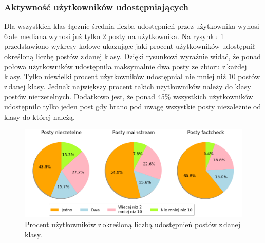\subsubsection{Aktywność użytkowników udostępniających}
Dla wszystkich klas łącznie średnia liczba udostępnień przez użytkownika wynosi 6\,ale mediana wynosi już tylko 2 posty na użytkownika. Na rysynku \ref{fig:retweets-per-user} przedstawiono wykresy kołowe ukazujące jaki procent użytkowników udostępnił określoną liczbę postów z\,danej klasy. Dzięki rysunkowi wyraźnie widać, że ponad połowa użytkowników udostępniła maksymalnie dwa posty ze zbioru z\,każdej klasy. Tylko niewielki procent użytkowników udostępniał nie mniej niż 10 postów z\,danej klasy. Jednak największy procent takich użytkowników należy do klasy postów nierzetelnych. Dodatkowo jest, że ponad 45\% wszystkich użytkowników udostępniło tylko jeden post gdy brano pod uwagę wszystkie posty niezależnie od klasy do której należą.
\begin{figure}[!h]
	\centering \includegraphics[width=0.95\linewidth]{img/results/retweetsperuser.png}
	\caption{Procent użytkowników z\,określoną liczbą udostępnień postów z\,danej klasy.} \label{fig:retweets-per-user}
\end{figure}


